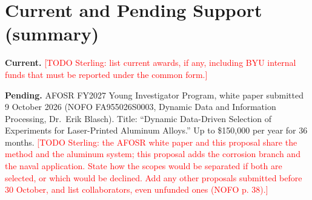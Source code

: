\documentclass[12pt,letterpaper]{article}
\newcommand{\todo}[1]{\textcolor{red}{[TODO Sterling: #1]}}
\begin{document}
\section*{Current and Pending Support (summary)}

\textbf{Current.} \todo{list current awards, if any, including BYU internal
funds that must be reported under the common form.}

\textbf{Pending.} AFOSR FY2027 Young Investigator Program, white paper
submitted 9 October 2026 (NOFO FA955026S0003, Dynamic Data and Information
Processing, Dr.~Erik Blasch). Title: ``Dynamic Data-Driven Selection of
Experiments for Laser-Printed Aluminum Alloys.'' Up to \$150,000 per year for
36 months. \todo{the AFOSR white paper and this proposal share the method and
the aluminum system; this proposal adds the corrosion branch and the naval
application. State how the scopes would be separated if both are selected,
or which would be declined. Add any other proposals submitted before 30
October, and list collaborators, even unfunded ones (NOFO p. 38).}
\end{document}
